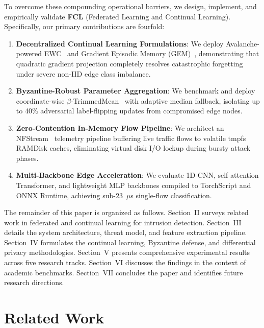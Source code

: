 \documentclass[journal,10pt,twocolumn]{IEEEtran}
\begin{document}
To overcome these compounding operational barriers, we design, implement, and empirically validate \textbf{FCL} (Federated Learning and Continual Learning). Specifically, our primary contributions are fourfold:
\begin{enumerate}
    \item \textbf{Decentralized Continual Learning Formulations}: We deploy Avalanche-powered EWC~\cite{carta2023avalanche} and Gradient Episodic Memory (GEM)~\cite{lopez2017gradient}, demonstrating that quadratic gradient projection completely resolves catastrophic forgetting under severe non-IID edge class imbalance.
    \item \textbf{Byzantine-Robust Parameter Aggregation}: We benchmark and deploy coordinate-wise $\beta$-TrimmedMean~\cite{yin2018byzantine} with adaptive median fallback, isolating up to 40\% adversarial label-flipping updates from compromised edge nodes.
    \item \textbf{Zero-Contention In-Memory Flow Pipeline}: We architect an NFStream~\cite{aouiti2022nfstream} telemetry pipeline buffering live traffic flows to volatile tmpfs RAMDisk caches, eliminating virtual disk I/O lockup during bursty attack phases.
    \item \textbf{Multi-Backbone Edge Acceleration}: We evaluate 1D-CNN, self-attention Transformer, and lightweight MLP backbones compiled to TorchScript and ONNX Runtime, achieving sub-23~$\mu$s single-flow classification.
\end{enumerate}

The remainder of this paper is organized as follows. Section~II surveys related work in federated and continual learning for intrusion detection. Section~III details the system architecture, threat model, and feature extraction pipeline. Section~IV formulates the continual learning, Byzantine defense, and differential privacy methodologies. Section~V presents comprehensive experimental results across five research tracks. Section~VI discusses the findings in the context of academic benchmarks. Section~VII concludes the paper and identifies future research directions.

\section{Related Work}
\end{document}
